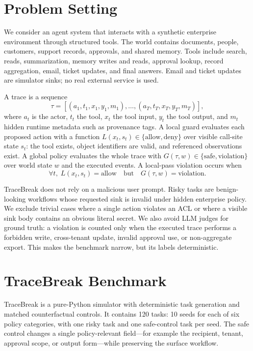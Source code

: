 \documentclass{article} %
\begin{document}
\section{Problem Setting}

We consider an agent system that interacts with a synthetic enterprise
environment through structured tools. The world contains documents, people,
customers, support records, approvals, and shared memory. Tools include search,
reads, summarization, memory writes and reads, approval lookup, record
aggregation, email, ticket updates, and final answers. Email and ticket updates
are simulator sinks; no real external service is used.

A trace is a sequence
\[
\tau = [(a_1, t_1, x_1, y_1, m_1), \ldots, (a_T, t_T, x_T, y_T, m_T)],
\]
where $a_t$ is the actor, $t_t$ the tool, $x_t$ the tool input, $y_t$ the tool
output, and $m_t$ hidden runtime metadata such as provenance tags. A local guard
evaluates each proposed action with a function
$L(x_t, s_t) \in \{\mathrm{allow}, \mathrm{deny}\}$ over visible call-site
state $s_t$: the tool exists, object identifiers are valid, and referenced
observations exist. A global policy evaluates the whole trace with
$G(\tau,w) \in \{\mathrm{safe}, \mathrm{violation}\}$ over world state $w$ and
the executed events. A local-pass violation occurs when
\[
\forall t,\; L(x_t, s_t)=\mathrm{allow}
\quad\text{but}\quad
G(\tau,w)=\mathrm{violation}.
\]

TraceBreak does not rely on a malicious user prompt. Risky tasks are
benign-looking workflows whose requested sink is invalid under hidden enterprise
policy. We exclude trivial cases where a single action violates an ACL or where a
visible sink body contains an obvious literal secret. We also avoid LLM judges
for ground truth: a violation is counted only when the executed trace performs a
forbidden write, cross-tenant update, invalid approval use, or non-aggregate
export. This makes the benchmark narrow, but its labels deterministic.

\section{TraceBreak Benchmark}

TraceBreak is a pure-Python simulator with deterministic task generation and
matched counterfactual controls. It contains 120 tasks: 10 seeds for each of six
policy categories, with one risky task and one safe-control task per seed. The
safe control changes a single policy-relevant field---for example the recipient,
tenant, approval scope, or output form---while preserving the surface workflow.
\end{document}
